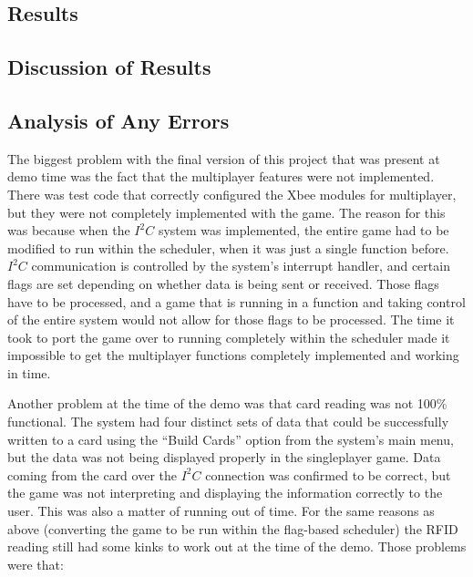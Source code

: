 \documentclass[12pt]{article} %
\begin{document}
\begin{itemize}
\begin{itemize}
\begin{itemize}
\begin{itemize}
\begin{itemize}
\subsection{Results } %

\subsection{Discussion of Results } %

\subsection{Analysis of Any Errors } %
%

The biggest problem with the final version of this project that was present at
demo time was the fact that the multiplayer features were not implemented.
There was test code that correctly configured the Xbee modules for multiplayer,
but they were not completely implemented with the game.  The reason for this
was because when the $I^2C$ system was implemented, the entire game had to be
modified to run within the scheduler, when it was just a single function
before.  $I^2C$ communication is controlled by the system's interrupt handler,
and certain flags are set depending on whether data is being sent or received.
Those flags have to be processed, and a game that is running in a function and
taking control of the entire system would not allow for those flags to be
processed.  The time it took to port the game over to running completely within
the scheduler made it impossible to get the multiplayer functions completely
implemented and working in time.

Another problem at the time of the demo was that card reading was not 100\%
functional.  The system had four distinct sets of data that could be
successfully written to a card using the ``Build Cards'' option from the
system's main menu, but the data was not being displayed properly in the
singleplayer game.  Data coming from the card over the $I^2C$ connection was
confirmed to be correct, but the game was not interpreting and displaying the
information correctly to the user.  This was also a matter of running out of
time.  For the same reasons as above (converting the game to be run within the
flag-based scheduler) the RFID reading still had some kinks to work out at the
time of the demo.  Those problems were that:


\end{itemize}
\end{itemize}
\end{itemize}
\end{itemize}
\end{itemize}
\end{document}
